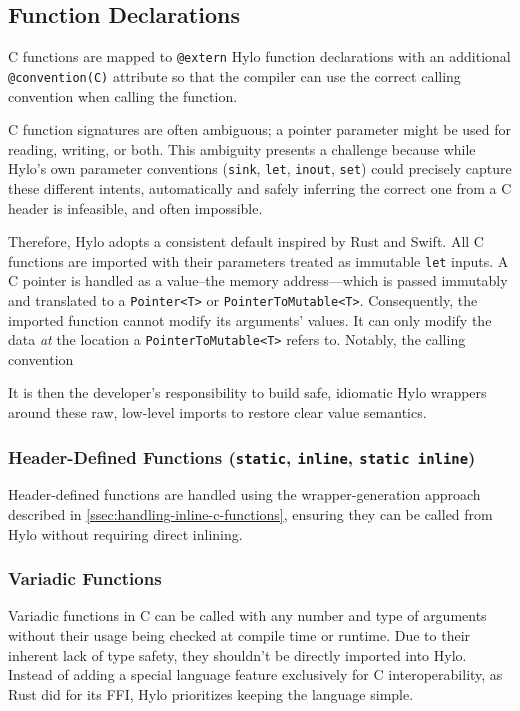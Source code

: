 \subsection{Function Declarations}
C functions are mapped to \texttt{@extern} Hylo function declarations with an additional \texttt{@convention(C)} attribute so that the compiler can use the correct calling convention when calling the function.

C function signatures are often ambiguous; a pointer parameter might be used for reading, writing, or both. This ambiguity presents a challenge because while Hylo's own parameter conventions (\texttt{sink}, \texttt{let}, \texttt{inout}, \texttt{set}) could precisely capture these different intents, automatically and safely inferring the correct one from a C header is infeasible, and often impossible.

Therefore, Hylo adopts a consistent default inspired by Rust and Swift. All C functions are imported with their parameters treated as immutable \texttt{let} inputs. A C pointer is handled as a value--the memory address—which is passed immutably and translated to a \texttt{Pointer<T>} or \texttt{PointerToMutable<T>}. Consequently, the imported function cannot modify its arguments' values. It can only modify the data \textit{at} the location a \texttt{PointerToMutable<T>} refers to. Notably, the calling convention 

It is then the developer's responsibility to build safe, idiomatic Hylo wrappers around these raw, low-level imports to restore clear value semantics.

\subsubsection{Header-Defined Functions (\texttt{static}, \texttt{inline}, \texttt{static inline})}
Header-defined functions are handled using the wrapper-generation approach described in \autoref{ssec:handling-inline-c-functions}, ensuring they can be called from Hylo without requiring direct inlining.

\subsubsection{Variadic Functions}
Variadic functions in C can be called with any number and type of arguments without their usage being checked at compile time or runtime. Due to their inherent lack of type safety, they shouldn't be directly imported into Hylo. Instead of adding a special language feature exclusively for C interoperability, as Rust did for its FFI\cite{rust-variadic-ffi}, Hylo prioritizes keeping the language simple.

